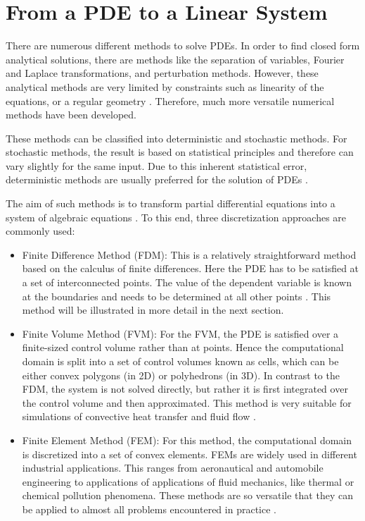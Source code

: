\section{From a PDE to a Linear System}
There are numerous different methods to solve PDEs. In order to find closed form analytical solutions, there are methods like the separation of variables, Fourier and Laplace transformations, and perturbation methods. However, these analytical methods are very limited by constraints such as linearity of the equations, or a regular geometry \cite{mazumder2015numerical}. Therefore, much more versatile numerical methods have been developed. 

These methods can be classified into deterministic and stochastic methods. For stochastic methods, the result is based on statistical principles and therefore can vary slightly for the same input. Due  to this inherent statistical error, deterministic methods are usually preferred for the solution of PDEs \cite{mazumder2015numerical}. 


The aim of such methods is to transform partial differential equations into a system of algebraic equations \cite{jasak1996error}. To this end, three discretization approaches are commonly used:
\begin{itemize}
\item Finite Difference Method (FDM): This is a relatively straightforward method based on the calculus of finite differences. Here the PDE has to be satisfied at a set of interconnected points. The value of the dependent variable is known at the boundaries and needs to be determined at all other points \cite{mazumder2015numerical}. This method will be illustrated in more detail in the next section. 
\item Finite Volume Method (FVM): For the FVM, the PDE is satisfied over a finite-sized control volume rather than at points. Hence the computational domain is split into a set of control volumes known as cells, which can be either convex polygons (in 2D) or polyhedrons (in 3D). In contrast to the FDM, the system is not solved directly, but rather it is first integrated over the control volume and then approximated.  This method is very suitable for simulations of convective heat transfer and fluid flow \cite{raithby1990finite,mazumder2015numerical}.

\item Finite Element Method (FEM): For this method, the computational domain is discretized into a set of convex elements. FEMs are widely used in different industrial applications. This ranges from aeronautical and automobile engineering to applications of applications of fluid mechanics, like thermal or chemical pollution phenomena. These methods are so versatile that they can be applied to almost all problems encountered in practice \cite{dhatt_fem}.
\end{itemize}

